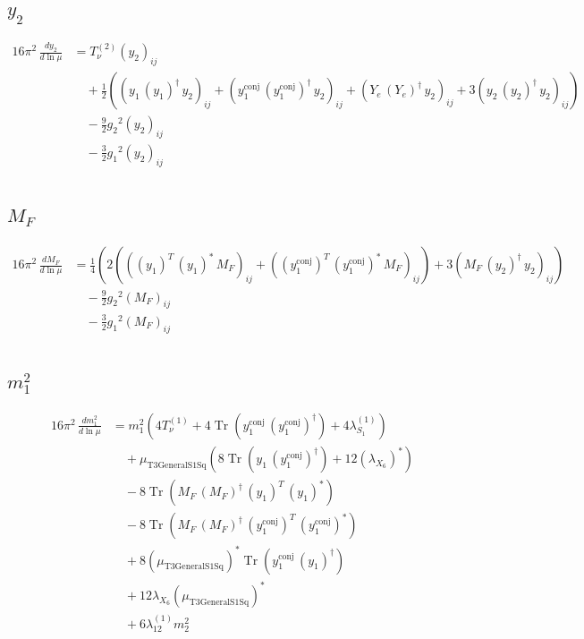 \documentclass[10pt,a4paper]{article}
\begin{document}
\subsection*{$y_2$}
\begin{align*}
16\pi^2\,\frac{d y_2}{d\ln\mu} &=T_{\nu}^{(2)} \left({y_2}\right)_{ij} \\
&\quad +\frac{1}{2} (\left({y_1}\,\left({y_1}\right)^{\dagger}\,{y_2}\right)_{ij}+\left({y_{1}^{\mathrm{conj}}}\,\left({y_{1}^{\mathrm{conj}}}\right)^{\dagger}\,{y_2}\right)_{ij}+\left({Y_e}\,\left({Y_e}\right)^{\dagger}\,{y_2}\right)_{ij}+3 \left({y_2}\,\left({y_2}\right)^{\dagger}\,{y_2}\right)_{ij}) \\
&\quad -\frac{9}{2} {g_2}^2 \left({y_2}\right)_{ij} \\
&\quad -\frac{3}{2} {g_1}^2 \left({y_2}\right)_{ij} \\
\end{align*}
\subsection*{$M_F$}
\begin{align*}
16\pi^2\,\frac{d M_F}{d\ln\mu} &=\frac{1}{4} (2 (\left(\left({y_1}\right)^{T}\,\left({y_1}\right)^{*}\,{M_F}\right)_{ij}+\left(\left({y_{1}^{\mathrm{conj}}}\right)^{T}\,\left({y_{1}^{\mathrm{conj}}}\right)^{*}\,{M_F}\right)_{ij})+3 \left({M_F}\,\left({y_2}\right)^{\dagger}\,{y_2}\right)_{ij}) \\
&\quad -\frac{9}{2} {g_2}^2 \left({M_F}\right)_{ij} \\
&\quad -\frac{3}{2} {g_1}^2 \left({M_F}\right)_{ij} \\
\end{align*}
\subsection*{$m_1^2$}
\begin{align*}
16\pi^2\,\frac{d m_1^2}{d\ln\mu} &={m_1^2} (4 T_{\nu}^{(1)}+4 \operatorname{Tr}\!\left({y_{1}^{\mathrm{conj}}}\,\left({y_{1}^{\mathrm{conj}}}\right)^{\dagger}\right)+4 {\lambda_{S_1}^{(1)}}) \\
&\quad +{\mu_{\mathrm{T3GeneralS1Sq}}} (8 \operatorname{Tr}\!\left({y_1}\,\left({y_{1}^{\mathrm{conj}}}\right)^{\dagger}\right)+12 \left({\lambda_{X_{6}}}\right)^{*}) \\
&\quad -8 \operatorname{Tr}\!\left({M_F}\,\left({M_F}\right)^{\dagger}\,\left({y_1}\right)^{T}\,\left({y_1}\right)^{*}\right) \\
&\quad -8 \operatorname{Tr}\!\left({M_F}\,\left({M_F}\right)^{\dagger}\,\left({y_{1}^{\mathrm{conj}}}\right)^{T}\,\left({y_{1}^{\mathrm{conj}}}\right)^{*}\right) \\
&\quad +8 \left({\mu_{\mathrm{T3GeneralS1Sq}}}\right)^{*} \operatorname{Tr}\!\left({y_{1}^{\mathrm{conj}}}\,\left({y_1}\right)^{\dagger}\right) \\
&\quad +12 {\lambda_{X_{6}}} \left({\mu_{\mathrm{T3GeneralS1Sq}}}\right)^{*} \\
&\quad +6 {\lambda_{12}^{(1)}} {m_2^2} \\
\end{align*}
\end{document}
